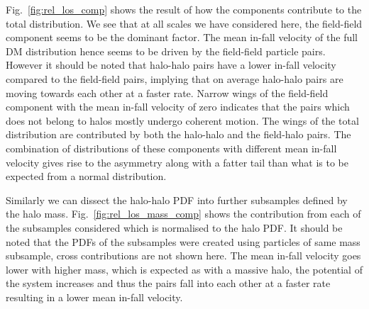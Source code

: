 \documentclass[a4paper,fleqn,usenatbib]{mnras}
\begin{document}
	Fig.~\ref{fig:rel_los_comp} shows the result of how the components contribute to the total distribution. We see that at all scales we have considered here, the field-field component seems to be the dominant factor. The mean in-fall velocity of the full DM distribution hence seems to be driven by the field-field particle pairs. However it should be noted that halo-halo pairs have a lower in-fall velocity compared to the field-field pairs, implying that on average halo-halo pairs are moving towards each other at a faster rate.  Narrow wings of the field-field component with the mean in-fall velocity of zero indicates that the pairs  which does not belong to halos mostly undergo coherent motion. The wings of the total distribution are contributed by both the halo-halo and the field-halo pairs. The combination of distributions of these components with different mean in-fall velocity gives rise to the asymmetry along with a fatter tail than what is to be expected from a normal distribution. 
	
	Similarly we can dissect the halo-halo PDF into further subsamples defined by the halo mass. Fig.~\ref{fig:rel_los_mass_comp} shows the contribution from each of the subsamples considered which is normalised to the halo PDF. It should be noted that the PDFs of the subsamples were created using particles of same mass subsample, cross contributions are not shown here. The mean in-fall velocity goes lower with higher mass, which is expected as with a massive halo, the potential of the system increases and thus the pairs fall into each other at a faster rate resulting in a lower mean in-fall velocity.
	
\end{document}

